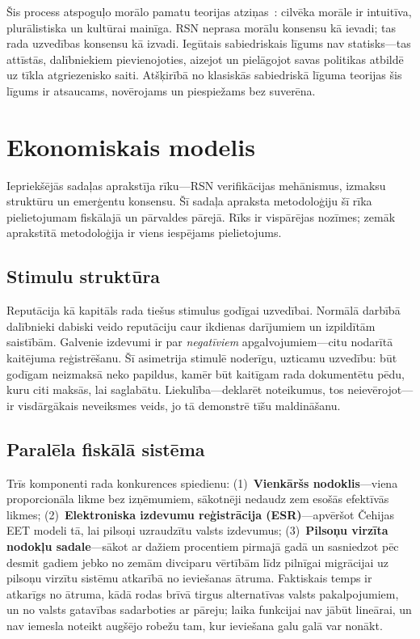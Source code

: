 \documentclass[11pt,a4paper,twocolumn]{article}
\begin{document}
Šis process atspoguļo morālo pamatu teorijas atziņas~\cite{haidt2012}: cilvēka morāle ir intuitīva, plurālistiska un kultūrai mainīga. RSN neprasa morālu konsensu kā ievadi; tas rada uzvedības konsensu kā izvadi. Iegūtais sabiedriskais līgums nav statisks---tas attīstās, dalībniekiem pievienojoties, aizejot un pielāgojot savas politikas atbildē uz tīkla atgriezenisko saiti. Atšķirībā no klasiskās sabiedriskā līguma teorijas šis līgums ir atsaucams, novērojams un piespiežams bez suverēna.

\section{Ekonomiskais modelis}

Iepriekšējās sadaļas aprakstīja rīku---RSN verifikācijas mehānismus, izmaksu struktūru un emerģentu konsensu. Šī sadaļa apraksta metodoloģiju šī rīka pielietojumam fiskālajā un pārvaldes pārejā. Rīks ir vispārējas nozīmes; zemāk aprakstītā metodoloģija ir viens iespējams pielietojums.

\subsection{Stimulu struktūra}

Reputācija kā kapitāls rada tiešus stimulus godīgai uzvedībai. Normālā darbībā dalībnieki dabiski veido reputāciju caur ikdienas darījumiem un izpildītām saistībām. Galvenie izdevumi ir par \emph{negatīviem} apgalvojumiem---citu nodarītā kaitējuma reģistrēšanu. Šī asimetrija stimulē noderīgu, uzticamu uzvedību: būt godīgam neizmaksā neko papildus, kamēr būt kaitīgam rada dokumentētu pēdu, kuru citi maksās, lai saglabātu. Liekulība---deklarēt noteikumus, tos neievērojot---ir vis\-dārgākais neveiksmes veids, jo tā demonstrē tīšu maldināšanu.

\subsection{Paralēla fiskālā sistēma}

Trīs komponenti rada konkurences spiedienu: (1)~\textbf{Vienkāršs nodoklis}---viena proporcionāla likme bez izņēmumiem, sākotnēji nedaudz zem esošās efektīvās likmes; (2)~\textbf{Elektroniska izdevumu reģistrācija (ESR)}---apvēršot Čehijas EET modeli tā, lai pilsoņi uzraudzītu valsts izdevumus; (3)~\textbf{Pilsoņu virzīta nodokļu sadale}---sākot ar dažiem procentiem pirmajā gadā un sasniedzot pēc desmit gadiem jebko no zemām divciparu vērtībām līdz pilnīgai migrācijai uz pilsoņu virzītu sistēmu atkarībā no ieviešanas ātruma. Faktiskais temps ir atkarīgs no ātruma, kādā rodas brīvā tirgus alternatīvas valsts pakalpojumiem, un no valsts gatavības sadarboties ar pāreju; laika funkcijai nav jābūt lineārai, un nav iemesla noteikt augšējo robežu tam, kur ieviešana galu galā var nonākt.
\end{document}
